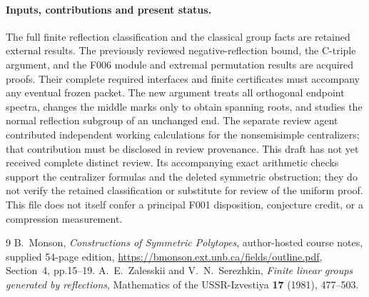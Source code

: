\documentclass[11pt,a4paper]{article}
\begin{document}
\paragraph{Inputs, contributions and present status.}
The full finite reflection classification and the classical group facts
are retained external results.
The previously reviewed negative-reflection bound, the C-triple
argument, and the F006 module and extremal permutation results are
acquired proofs. Their complete required interfaces and finite
certificates must accompany any eventual frozen packet. The new
argument treats all orthogonal endpoint spectra, changes the middle
marks only to obtain spanning roots, and studies the normal reflection
subgroup of an unchanged end. The separate review agent contributed
independent working calculations for the nonsemisimple centralizers;
that contribution must be disclosed in review provenance. This draft
has not yet received complete distinct review. Its accompanying exact
arithmetic checks support the centralizer formulas and the deleted
symmetric obstruction; they do not verify the retained classification
or substitute for review of the uniform proof. This file does not itself
confer a principal F001 disposition,
conjecture credit, or a compression measurement.

\begin{thebibliography}{9}
 B.~Monson, \emph{Constructions of Symmetric Polytopes},
author-hosted course notes, supplied 54-page edition,
\url{https://bmonson.ext.unb.ca/fields/outline.pdf}, Section~4,
pp.15--19.
 A.~E.~Zalesskii and V.~N.~Serezhkin,
\emph{Finite linear groups generated by reflections},
Mathematics of the USSR-Izvestiya \textbf{17} (1981), 477--503.
\end{thebibliography}
\end{document}
